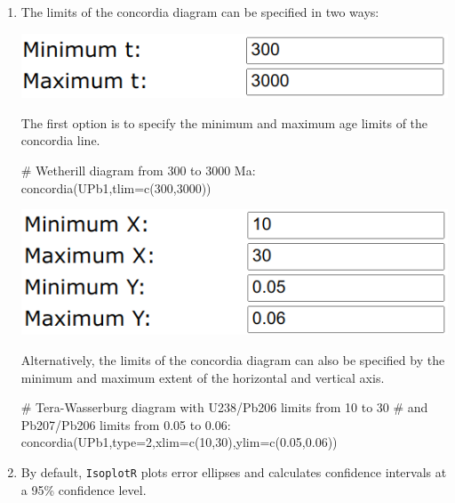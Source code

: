 \begin{refsection}
\begin{enumerate}
\item The limits of the concordia diagram can be specified in two
  ways:

  \noindent\begin{minipage}[t]{.4\linewidth}
  \strut\vspace*{-\baselineskip}\newline
  \includegraphics[width=\linewidth]{../figures/Concordiatlim.png}
\end{minipage}
\begin{minipage}[t]{.6\linewidth}
  The first option is to specify the minimum and maximum age limits of
  the concordia line.
\end{minipage}

\begin{script}
# Wetherill diagram from 300 to 3000 Ma:
concordia(UPb1,tlim=c(300,3000)) 
\end{script}

\noindent\begin{minipage}[t]{.4\linewidth}
  \strut\vspace*{-\baselineskip}\newline
  \includegraphics[width=\linewidth]{../figures/ConcordiaXYlim.png}
\end{minipage}
\begin{minipage}[t]{.6\linewidth}
  Alternatively, the limits of the concordia diagram can also be
  specified by the minimum and maximum extent of the horizontal and
  vertical axis.
\end{minipage}

\begin{script}
# Tera-Wasserburg diagram with U238/Pb206 limits from 10 to 30
# and Pb207/Pb206 limits from 0.05 to 0.06:
concordia(UPb1,type=2,xlim=c(10,30),ylim=c(0.05,0.06))
\end{script}

\item By default, \texttt{IsoplotR} plots error ellipses and
  calculates confidence intervals at a 95\% confidence level.


\end{enumerate}
\end{refsection}
